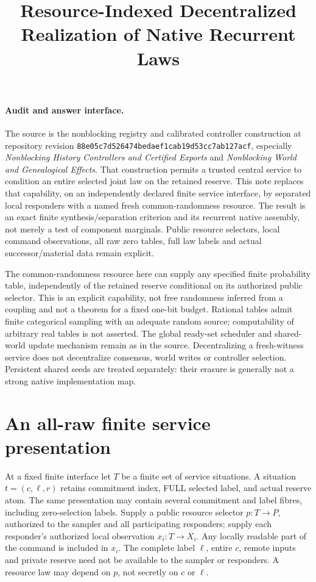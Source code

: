 \documentclass[11pt]{article}
\title{Resource-Indexed Decentralized Realization of Native Recurrent Laws}
\author{}\date{}
\begin{document}
\maketitle
\paragraph{Audit and answer interface.}
The source is the nonblocking registry and calibrated controller construction at repository revision \texttt{88e05c7d526474bedaef1cab19d53cc7ab127acf}, especially \emph{Nonblocking History Controllers and Certified Exports} and \emph{Nonblocking World and Genealogical Effects}. That construction permits a trusted central service to condition an entire selected joint law on the retained reserve. This note replaces that capability, on an independently declared finite service interface, by separated local responders with a named fresh common-randomness resource. The result is an exact finite synthesis/separation criterion and its recurrent native assembly, not merely a test of component marginals. Public resource selectors, local command observations, all raw zero tables, full law labels and actual successor/material data remain explicit.

The common-randomness resource here can supply any specified finite probability table, independently of the retained reserve conditional on its authorized public selector. This is an explicit capability, not free randomness inferred from a coupling and not a theorem for a fixed one-bit budget. Rational tables admit finite categorical sampling with an adequate random source; computability of arbitrary real tables is not asserted. The global ready-set scheduler and shared-world update mechanism remain as in the source. Decentralizing a fresh-witness service does not decentralize consensus, world writes or controller selection. Persistent shared seeds are treated separately: their erasure is generally not a strong native implementation map.

\section{An all-raw finite service presentation}
At a fixed finite interface let $T$ be a finite set of service situations. A situation $t=(c,\ell,r)$ retains commitment index, FULL selected label, and actual reserve atom. The same presentation may contain several commitment and label fibres, including zero-selection labels. Supply a public resource selector $p:T\to P$, authorized to the sampler and all participating responders; supply each responder's authorized local observation $x_i:T\to X_i$. Any locally readable part of the command is included in $x_i$. The complete label $\ell$, entire $c$, remote inputs and private reserve need not be available to the sampler or responders. A resource law may depend on $p$, not secretly on $c$ or $\ell$.
\end{document}
